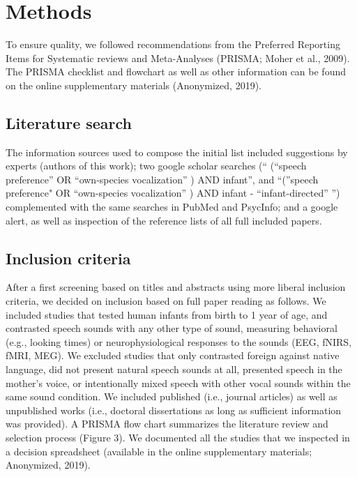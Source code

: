 \documentclass[man]{apa6}
\begin{document}
\section{Methods}\label{methods}

To ensure quality, we followed recommendations from the Preferred
Reporting Items for Systematic reviews and Meta-Analyses (PRISMA; Moher
et al., 2009). The PRISMA checklist and flowchart as well as other
information can be found on the online supplementary materials
(Anonymized, 2019).

\subsection{Literature search}\label{literature-search}

The information sources used to compose the initial list included
suggestions by experts (authors of this work); two google scholar
searches (`` (\enquote{speech preference} OR \enquote{own-species
vocalization} ) AND infant'', and \enquote{(}speech preference" OR
\enquote{own-species vocalization} ) AND infant -
\enquote{infant-directed} '') complemented with the same searches in
PubMed and PsycInfo; and a google alert, as well as inspection of the
reference lists of all full included papers.

\subsection{Inclusion criteria}\label{inclusion-criteria}

After a first screening based on titles and abstracts using more liberal
inclusion criteria, we decided on inclusion based on full paper reading
as follows. We included studies that tested human infants from birth to
1 year of age, and contrasted speech sounds with any other type of
sound, measuring behavioral (e.g., looking times) or neurophysiological
responses to the sounds (EEG, fNIRS, fMRI, MEG). We excluded studies
that only contrasted foreign against native language, did not present
natural speech sounds at all, presented speech in the mother's voice, or
intentionally mixed speech with other vocal sounds within the same sound
condition. We included published (i.e., journal articles) as well as
unpublished works (i.e., doctoral dissertations as long as sufficient
information was provided). A PRISMA flow chart summarizes the literature
review and selection process (Figure 3). We documented all the studies
that we inspected in a decision spreadsheet (available in the online
supplementary materials; Anonymized, 2019).
\end{document}
